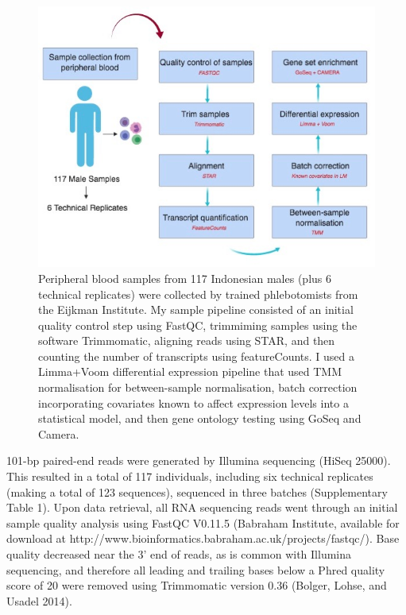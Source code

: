 \documentclass[12pt,a4paper,titlepage,twoside,openright]{book}
\begin{document}
\begin{mainmatter}
\begin{figure}[htb!]
\centering
\includegraphics[width=\textwidth,height=\textheight,keepaspectratio]{SamplePipeline.jpg}
\caption{Peripheral blood samples from 117 Indonesian males (plus 6 technical replicates) were collected by trained phlebotomists from the Eijkman Institute. My sample pipeline consisted of an initial quality control step using FastQC, trimmiming samples using the software Trimmomatic, aligning reads using STAR, and then counting the number of transcripts using featureCounts. I used a Limma+Voom differential expression pipeline that used TMM normalisation for between-sample normalisation, batch correction incorporating covariates known to affect expression levels into a statistical model, and then gene ontology testing using GoSeq and Camera.}
\label{fig:Study Pipeline}
\end{figure}

101-bp paired-end reads were generated by Illumina sequencing (HiSeq 25000). This resulted in a total of 117 individuals, including six technical replicates (making a total of 123 sequences), sequenced in three batches (Supplementary Table 1). Upon data retrieval, all RNA sequencing reads went through an initial sample quality analysis using FastQC V0.11.5 (Babraham Institute, available for download at http://www.bioinformatics.babraham.ac.uk/projects/fastqc/). Base quality decreased near the 3’ end of reads, as is common with Illumina sequencing, and therefore all leading and trailing bases below a Phred quality score of 20 were removed using Trimmomatic version 0.36 (Bolger, Lohse, and Usadel 2014).


\end{mainmatter}
\end{document}
